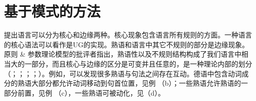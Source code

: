 \section{基于模式的方法}
\label{Abschnitt-musterbasiert}

\mbox{} \citet[--8]{Chomsky81a}提出语言可以分为核心和边缘两种。核心现象包含语言所有规则的方面。一种语言的核心语法可以看作是UG的实现。熟语和语言中其它不规则的部分是边缘现象。原则 \& 参数理论模型的批评者指出，熟语性以及不规则结构构成了我们语言中相当大的一部分，而且核心与边缘的区分是可变并且任意的，是一种理论内部的划分（\citealp[\S~7]{Jackendoff97a}；\citealp{Culicover99a-u}；\citealp[]{GSag2000a-u}；\citealp[]{Newmeyer2005a}；\citealp[]{Kuhn2007a}）。例如，可以发现很多熟语与句法之间存在互动\citep*{NSW94a}。德语中包含动词成分的熟语大部分都允许动词移动到句首位置，见例 （b）；一些熟语允许熟语的一部分前置，见例 （c），一些熟语可被动化，见（d）。

